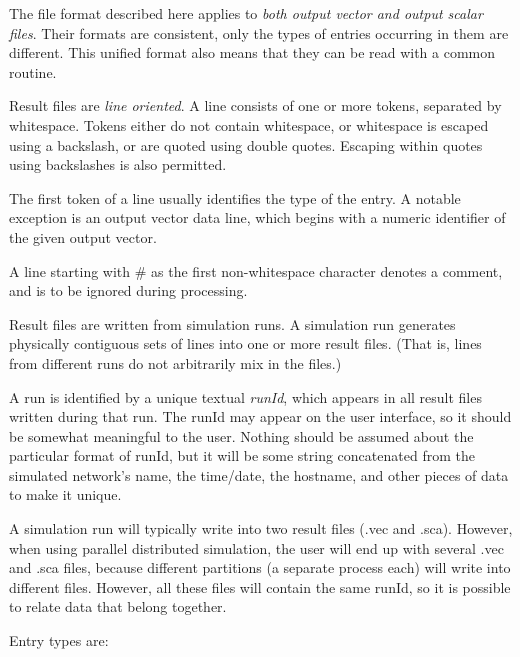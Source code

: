 \label{cha:result-file-formats}

The file format described here applies to \textit{both output vector and
output scalar files}. Their formats are consistent, only the types of
entries occurring in them are different. This unified format also
means that they can be read with a common routine.

Result files are \textit{line oriented}. A line consists of one or more
tokens, separated by whitespace. Tokens either do not
contain whitespace, or whitespace is escaped using a backslash, or
are quoted using double quotes. Escaping within quotes using
backslashes is also permitted.

The first token of a line usually identifies the type of the entry. A
notable exception is an output vector data line, which begins with a
numeric identifier of the given output vector.

A line starting with \# as the first non{}-whitespace character denotes
a comment, and is to be ignored during processing.

Result files are written from simulation runs. A simulation run
generates physically contiguous sets of lines into one or more result
files. (That is, lines from different runs do not arbitrarily mix in
the files.)

A run is identified by a unique textual \textit{runId}, which appears in
all result files written during that run. The runId may appear on the
user interface, so it should be somewhat meaningful to the user.
Nothing should be assumed about the particular format of runId, but it
will be some string concatenated from the simulated network's name, the
time/date, the hostname, and other pieces of data to make it unique.

A simulation run will typically write into two result files (.vec and
.sca). However, when using parallel distributed simulation, the user
will end up with several .vec and .sca files, because different
partitions (a separate process each) will write into different files.
However, all these files will contain the same runId, so it is possible
to relate data that belong together.

Entry types are:

